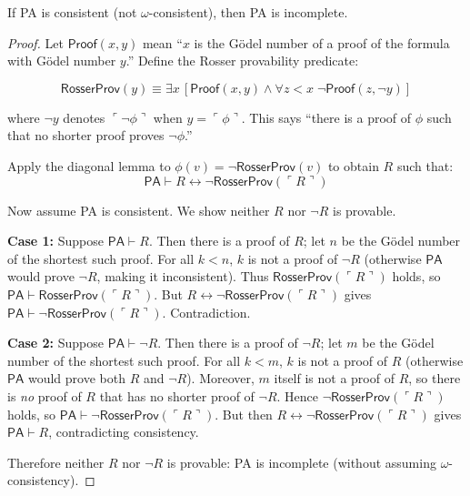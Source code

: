 \begin{theorem}
If PA is consistent (not $\omega$-consistent), then PA is incomplete.
\end{theorem}

\begin{proof}[Proof]
Let $\mathsf{Proof}(x, y)$ mean ``$x$ is the Gödel number of a proof of the formula with Gödel number $y$.'' Define the Rosser provability predicate:

\[
\mathsf{RosserProv}(y) \equiv \exists x\, [\mathsf{Proof}(x, y) \land \forall z < x\; \neg \mathsf{Proof}(z, \neg y)]
\]

where $\neg y$ denotes $\ulcorner \neg \phi \urcorner$ when $y = \ulcorner \phi \urcorner$. This says ``there is a proof of $\phi$ such that no shorter proof proves $\neg \phi$.''

Apply the diagonal lemma to $\phi(v) = \neg \mathsf{RosserProv}(v)$ to obtain $R$ such that:
\[
\mathsf{PA} \vdash R \leftrightarrow \neg \mathsf{RosserProv}(\ulcorner R \urcorner)
\]

Now assume PA is consistent. We show neither $R$ nor $\neg R$ is provable.

\textbf{Case 1:} Suppose $\mathsf{PA} \vdash R$. Then there is a proof of $R$; let $n$ be the Gödel number of the shortest such proof. For all $k < n$, $k$ is not a proof of $\neg R$ (otherwise $\mathsf{PA}$ would prove $\neg R$, making it inconsistent). Thus $\mathsf{RosserProv}(\ulcorner R \urcorner)$ holds, so $\mathsf{PA} \vdash \mathsf{RosserProv}(\ulcorner R \urcorner)$. But $R \leftrightarrow \neg \mathsf{RosserProv}(\ulcorner R \urcorner)$ gives $\mathsf{PA} \vdash \neg \mathsf{RosserProv}(\ulcorner R \urcorner)$. Contradiction.

\textbf{Case 2:} Suppose $\mathsf{PA} \vdash \neg R$. Then there is a proof of $\neg R$; let $m$ be the Gödel number of the shortest such proof. For all $k < m$, $k$ is not a proof of $R$ (otherwise $\mathsf{PA}$ would prove both $R$ and $\neg R$). Moreover, $m$ itself is not a proof of $R$, so there is \emph{no} proof of $R$ that has no shorter proof of $\neg R$. Hence $\neg \mathsf{RosserProv}(\ulcorner R \urcorner)$ holds, so $\mathsf{PA} \vdash \neg \mathsf{RosserProv}(\ulcorner R \urcorner)$. But then $R \leftrightarrow \neg \mathsf{RosserProv}(\ulcorner R \urcorner)$ gives $\mathsf{PA} \vdash R$, contradicting consistency.

Therefore neither $R$ nor $\neg R$ is provable: PA is incomplete (without assuming $\omega$-consistency).
\end{proof}

